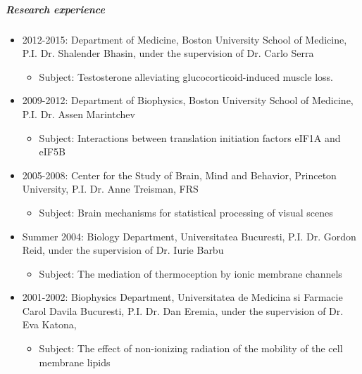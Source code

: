 \documentclass[12pt,english]{report}\usepackage[]{graphicx}\usepackage[]{color}
\begin{document}
\subparagraph*{Research experience}
\begin{itemize}
\item 2012-2015: Department of Medicine, Boston University School of Medicine,
P.I. Dr. Shalender Bhasin, under the supervision of Dr. Carlo Serra

\begin{itemize}
\item Subject: Testosterone alleviating glucocorticoid-induced muscle loss.
\end{itemize}
\item 2009-2012: Department of Biophysics, Boston University School of Medicine,
P.I. Dr. Assen Marintchev

\begin{itemize}
\item Subject: Interactions between translation initiation factors eIF1A
and eIF5B
\end{itemize}
\item 2005-2008: Center for the Study of Brain, Mind and Behavior, Princeton
University, P.I. Dr. Anne Treisman, FRS

\begin{itemize}
\item Subject: Brain mechanisms for statistical processing of visual scenes
\end{itemize}
\item Summer 2004: Biology Department, Universitatea Bucuresti, P.I. Dr.
Gordon Reid, under the supervision of Dr. Iurie Barbu

\begin{itemize}
\item Subject: The mediation of thermoception by ionic membrane channels
\end{itemize}
\item 2001-2002: Biophysics Department, Universitatea de Medicina si Farmacie
Carol Davila Bucuresti, P.I. Dr. Dan Eremia, under the supervision
of Dr. Eva Katona, 

\begin{itemize}
\item Subject: The effect of non-ionizing radiation of the mobility of the
cell membrane lipids
\end{itemize}
\end{itemize}
\end{document}
